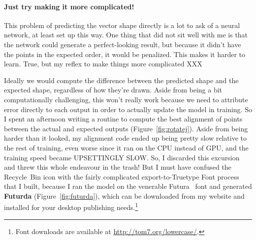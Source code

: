 \documentclass[twocolumn]{amsart}
\begin{document}
\paragraph{Just try making it more complicated!} This
problem of predicting the vector shape directly is a lot to ask of a
neural network, at least set up this way. One thing that did not sit
well with me is that the network could generate a perfect-looking
result, but because it didn't have the points in the expected order,
it would be penalized. This makes it harder to learn. True, but
my reflex to make things more complicated XXX

Ideally we would compute the difference between the predicted shape
and the expected shape, regardless of how they're drawn. Aside from
being a bit computationally challenging, this won't really work
because we need to attribute error directly to each output in order to
actually update the model in training. So I spent an afternoon writing
a routine to compute the best alignment of points between the actual
and expected outputs (Figure~\ref{fig:rotatej}). Aside from being
harder than it looked, my alignment code ended up being pretty slow
relative to the rest of training, even worse since it ran on the CPU
instead of GPU, and the training speed became UPSETTINGLY SLOW. So, I
discarded this excursion and threw this whole endeavour in the trash!
But I must have confused the Recycle~Bin icon with the fairly
complicated export-to-Truetype Font process that I built, because I
ran the model on the venerable Futura~\cite{futura} font and generated
{\bf Futurda} (Figure~\ref{fig:futurda}), which can be downloaded from my
website and installed for your desktop publishing needs.\footnote{Font
  downloads are available at \url{http://tom7.org/lowercase/}.}

\end{document}
